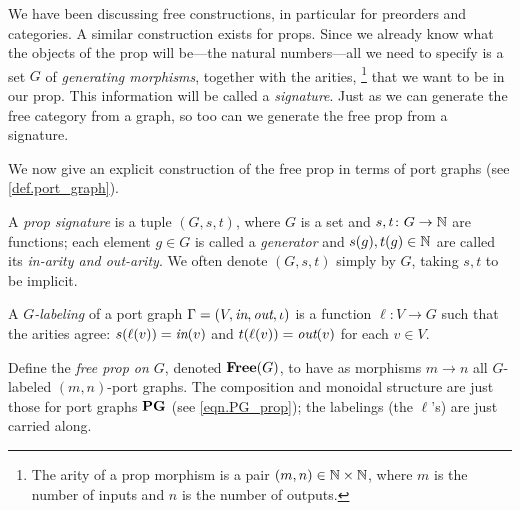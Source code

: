 \documentclass[7Sketches]{subfiles}
\begin{document}
We have been discussing free constructions, in particular for preorders and
categories. A similar construction exists for props. Since we already know what
the objects of the prop will be---the natural numbers---all we need to specify
is a set $G$ of \emph{generating morphisms}, together with the arities,%
\footnote{The arity of a prop morphism is a pair $(m,n)\in\mathbb{N}\times\mathbb{N}$, where
$m$ is the number of inputs and $n$ is the number of outputs.} that we want to
be in our prop. This information will be called a \emph{signature}. Just as we
can generate the free category from a graph, so too can we generate the free
prop from a signature. 

We now give an explicit construction of the free prop in terms of port graphs (see
\cref{def.port_graph}). 

\begin{definition}%
\label{def.free_prop}%
%
%
  A \emph{prop signature} is a tuple $(G,s,t)$, where $G$ is a set and $s,t\colon G \to \mathbb{N}$ are functions; each element $g\in G$ is called a \emph{generator} and $s(g),t(g)\in\mathbb{N}$ are called its \emph{in-arity and out-arity}. We often denote $(G,s,t)$ simply by $G$, taking $s,t$ to be implicit.%
  
  A \emph{$G$-labeling} of a port graph $\Gamma=(V,\textit{in},\textit{out},\iota)$ is a
  function $\ell\colon V\to G$ such that the arities agree:
  $s(\ell(v))=\textit{in}(v)$ and $t(\ell(v))=\textit{out}(v)$ for each $v\in V$.
  
  Define the \emph{free prop on $G$}, denoted $\mathbf{Free}(G)$, to have as morphisms
  $m\to n$ all $G$-labeled $(m,n)$-port graphs. The composition and monoidal
  structure are just those for port graphs $\mathbf{PG}$ (see \cref{eqn.PG_prop});
  the labelings (the $\ell$'s) are just carried along. 
\end{definition}
\end{document}
